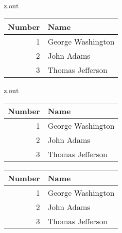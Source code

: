 \MyIOS


\begin{VerbatimOut}{z.out}


\newpage

\setlength{\LTcapwidth}{\textwidth}
\addtolength{\LTcapwidth}{-4\parindent}

\newlength{\twidth}
\newlength{\theight}

\setlength{\twidth}{\textwidth}
\setlength{\theight}{\textheight}

\begin{sidewaystable}
  \setlength{\textwidth}{\theight}
  \setlength{\textheight}{\twidth}
  \caption{Sidewaystable of the first three American Presidents.}
  \vspace*{6pt}
  \centering
    \begin{tabular}{@{}rl@{}}
      \toprule
      \bf Number& \bf Name\\
      \midrule
      1& George Washington\\
      2& John Adams\\
      3& Thomas Jefferson\\
      \bottomrule
    \end{tabular}
\end{sidewaystable}
\end{VerbatimOut}

\MyIOS

\begin{VerbatimOut}{z.out}
\begin{sidewaystable}
  \setlength{\textwidth}{\theight}
  \setlength{\textheight}{\twidth}
  \caption{Two tables can be placed vertically in a sidewaystable environment.}
  \vspace*{6pt}
  \centering
    \begin{tabular}{@{}rl@{}}
      \toprule
      \bf Number& \bf Name\\
      \midrule
      1& George Washington\\
      2& John Adams\\
      3& Thomas Jefferson\\
      \bottomrule
    \end{tabular}
  \vspace*{2\baselineskip}
  \caption{This is the second table in the sideways environment.}
  \vspace*{6pt}
    \begin{tabular}{@{}rl@{}}
      \toprule
      \bf Number& \bf Name\\
      \midrule
      1& George Washington\\
      2& John Adams\\
      3& Thomas Jefferson\\
      \bottomrule
    \end{tabular}
\end{sidewaystable}
\end{VerbatimOut}

